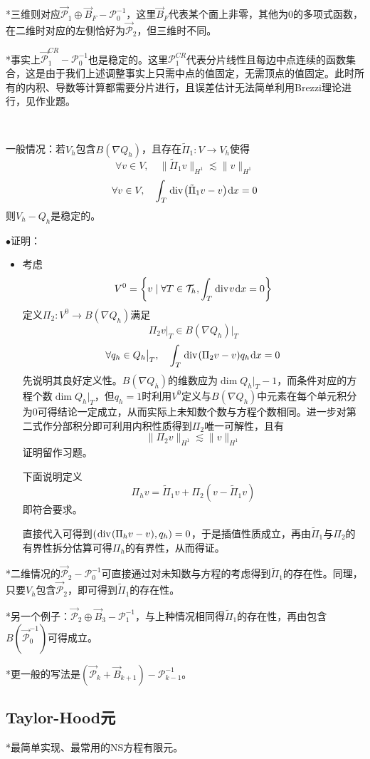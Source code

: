 \documentclass[a4paper,UTF8,fontset=windows]{ctexart}
\newcommand*{\dr}{\hspace{0.07em}\mathrm{d}}
\newcommand*{\cp}{\mathcal{P}}
\newcommand*{\ct}{\mathcal{T}}
\renewcommand*{\div}{\hspace{0.07em}\mathrm{div}\hspace{0.07em}}
\newcommand{\proo}[1]{{\kaishu $\bullet$证明：
\begin{itemize}
    \item[] #1
\end{itemize}
}}
\begin{document}
\begin{enumerate}
    *三维则对应$\vec{\cp}_1\oplus\vec{B}_F-\cp_0^{-1}$，这里$\vec{B}_F$代表某个面上非零，其他为0的多项式函数，在二维时对应的左侧恰好为$\vec{\cp}_2$，但三维时不同。

    *事实上$\vec{\cp}_1^{CR}-\cp_0^{-1}$也是稳定的。这里$\cp_1^{CR}$代表分片线性且每边中点连续的函数集合，这是由于我们上述调整事实上只需中点的值固定，无需顶点的值固定。此时所有的内积、导数等计算都需要分片进行，且误差估计无法简单利用Brezzi理论进行，见作业题。

    \

    一般情况：若$V_h$包含$B(\nabla Q_h)$，且存在$\tilde\Pi_1:V\to V_h$使得
    $$\forall v\in V,\quad\|\tilde\Pi_1v\|_{H^1}\lesssim\|v\|_{H^1}$$
    $$\forall v\in V,\quad\int_T\div\big(\tilde\Pi_1v-v\big)\dr x=0$$
    则$V_h-Q_h$是稳定的。

    \proo{
        考虑
        $$V^0=\bigg\{v\mid\forall T\in\ct_h,\int_T\div v\dr x=0\bigg\}$$
        定义$\Pi_2:V^0\to B(\nabla Q_h)$满足
        $$\Pi_2v\big|_T\in B(\nabla Q_h)\big|_T$$
        $$\forall q_h\in Q_h\big|_T,\quad\int_T\div(\Pi_2v-v)q_h\dr x=0$$
        先说明其良好定义性。$B(\nabla Q_h)$的维数应为$\dim Q_h\big|_T-1$，而条件对应的方程个数$\dim Q_h\big|_T$，但$q_h=1$时利用$V^0$定义与$B(\nabla Q_h)$中元素在每个单元积分为0可得结论一定成立，从而实际上未知数个数与方程个数相同。进一步对第二式作分部积分即可利用内积性质得到$\Pi_2$唯一可解性，且有
        $$\|\Pi_2v\|_{H^1}\lesssim\|v\|_{H^1}$$
        证明留作习题。

        下面说明定义
        $$\Pi_hv=\tilde\Pi_1v+\Pi_2(v-\tilde\Pi_1v)$$
        即符合要求。

        直接代入可得到$(\div(\Pi_hv-v),q_h)=0$，于是插值性质成立，再由$\tilde\Pi_1$与$\Pi_2$的有界性拆分估算可得$\Pi_h$的有界性，从而得证。
    }

    *二维情况的$\vec{\cp}_2-\cp_0^{-1}$可直接通过对未知数与方程的考虑得到$\tilde\Pi_1$的存在性。同理，只要$V_h$包含$\vec{\cp}_2$，即可得到$\tilde\Pi_1$的存在性。

    *另一个例子：$\vec{\cp}_2\oplus\vec{B}_3-\cp_1^{-1}$，与上种情况相同得$\tilde\Pi_1$的存在性，再由包含$B(\vec{\cp}_0^{-1})$可得成立。

    *更一般的写法是$(\vec{\cp}_k+\vec{B}_{k+1})-\cp_{k-1}^{-1}$。
\end{enumerate}

\subsection{Taylor-Hood元}
*最简单实现、最常用的NS方程有限元。
\end{document}
